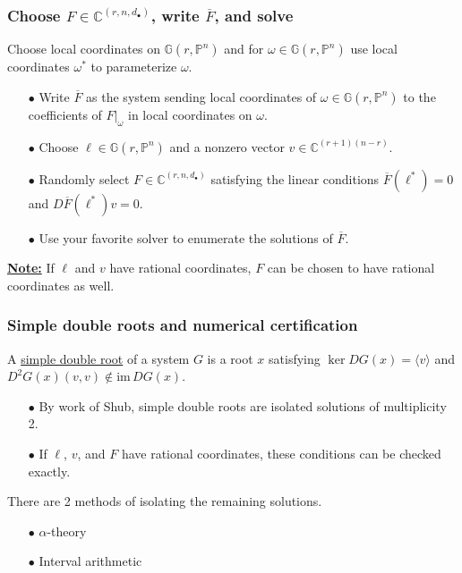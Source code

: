\documentclass{beamer}
\theoremstyle{definition}
\newcommand{\blue}[1]{{\color{black!15!blue}\underline{#1}}}
\begin{document}
\begin{frame}
\frametitle{Choose $F\in\mathbb{C}^{(r,n,d_\bullet)}$, write $\overline{F}$, and solve}
Choose local coordinates on $\mathbb{G}(r,\mathbb{P}^n)$ and for $\omega\in\mathbb{G}(r,\mathbb{P}^n)$ use local coordinates $\omega^\ast$ to parameterize $\omega$.
\vspace{-.1cm}
\begin{enumerate}
\item[$\bullet$] Write $\overline{F}$ as the system sending local coordinates of $\omega\in\mathbb{G}(r,\mathbb{P}^n)$ to the coefficients of $F|_\omega$ in local coordinates on $\omega$.

\item[$\bullet$] Choose $\ell\in\mathbb{G}(r,\mathbb{P}^n)$ and a nonzero vector $v\in\mathbb{C}^{(r+1)(n-r)}$.

\item[$\bullet$] Randomly select $F\in\mathbb{C}^{(r,n,d_\bullet)}$ satisfying the linear conditions $\overline{F}(\ell^\ast)=0$ and $D\overline{F}(\ell^\ast)v=0$.

\item[$\bullet$] Use your favorite solver to enumerate the solutions of $\overline{F}$.
\end{enumerate}

\textbf{\underline{Note:}} If $\ell$ and $v$ have rational coordinates, $F$ can be chosen to have rational coordinates as well.
\end{frame}



\begin{frame}
\frametitle{Simple double roots and numerical certification}
A \blue{simple double root} of a system $G$ is a root $x$ satisfying $\ker DG(x) = \langle v \rangle$ and $D^2G(x)(v,v)\not\in \text{im}\,DG(x)$. 
\vspace{-.2cm}
\begin{enumerate}
\item[$\bullet$] By work of Shub, simple double roots are isolated solutions of multiplicity 2.

\item[$\bullet$] If $\ell$, $v$, and $F$ have rational coordinates, these conditions can be checked exactly.
\end{enumerate}

There are 2 methods of isolating the remaining solutions.
\vspace{-.2cm}
\begin{enumerate}
\item[$\bullet$] $\alpha$-theory 

\item[$\bullet$] Interval arithmetic
\end{enumerate}
\end{frame}
\end{document}
